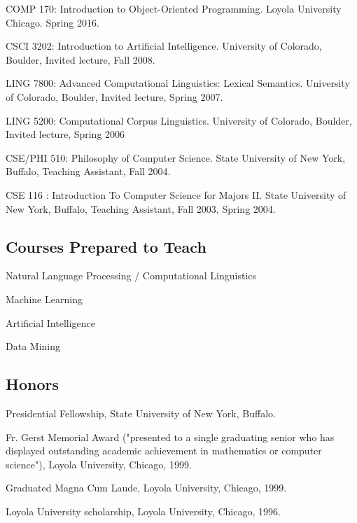 \documentclass[letterpaper]{article}
\renewenvironment{itemize}{
  \begin{list}{}{
    \setlength{\leftmargin}{1.5em}
  }
}{
  \end{list}
}
\begin{document}
\begin{itemize}
\item COMP 170: Introduction to Object-Oriented Programming. Loyola University Chicago. Spring 2016.
\item CSCI 3202: Introduction to Artificial Intelligence. University of Colorado, Boulder, Invited lecture, Fall 2008.
\item LING 7800: Advanced Computational Linguistics: Lexical Semantics. University of Colorado, Boulder, Invited lecture, Spring 2007.
\item LING 5200: Computational Corpus Linguistics. University of Colorado, Boulder, Invited lecture, Spring 2006
\item CSE/PHI 510: Philosophy of Computer Science. State University of New York, Buffalo, Teaching Assistant, Fall 2004.
\item CSE 116 : Introduction To Computer Science for Majors II. State University of New York, Buffalo, Teaching Assistant, Fall 2003, Spring 2004. 
\end{itemize}

\subsection*{Courses Prepared to Teach}

\begin{itemize}
\item Natural Language Processing / Computational Linguistics
\item Machine Learning
\item Artificial Intelligence
\item Data Mining
\end{itemize}

\subsection*{Honors}
\begin{itemize}
\item Presidential Fellowship, State University of New York, Buffalo. 
\item Fr. Gerst Memorial Award ("presented to a single graduating senior who has displayed outstanding academic achievement in mathematics or computer science"), Loyola University, Chicago, 1999.
\item Graduated Magna Cum Laude, Loyola University, Chicago, 1999.
\item Loyola University scholarship, Loyola University, Chicago, 1996.
\end{itemize}
\end{document}
